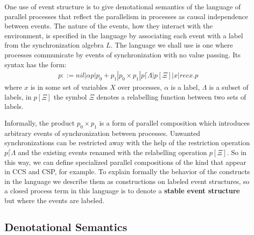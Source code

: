 
One use of event structure is to give denotational semantics of the language of parallel
processes that reflect the parallelism in processes as causal independence between events.
The nature of the events, how they interact with the environment,
is specified in the language by associating each event with a label from the synchronization
algebra $L$.
The language we shall use is one where processes communicate by events of synchronization
with no value passing.
Its syntax has the form:
\begin{align*}
    p ::= nil | \alpha p | p_0 + p_1 | p_0 \times p_1 | p\lceil \Lambda | p[\Xi] | x | recx.p
\end{align*}
where $x$ is in some set of variables $X$ over processes, $\alpha$ is a label,
$\Lambda$ is a subset of labels, in $p[\Xi]$ the symbol $\Xi$ denotes a relabelling function between
two sets of labels.

Informally, the product $p_0 \times p_1$ is a form of parallel composition which introduces
arbitrary events of synchronization between processes.
Unwanted synchronizations can be restricted away with the help of the restriction operation
$p\lceil \Lambda$ and the existing events renamed with the relabelling operation $p[\Xi]$.
So in this way, we can define specialized parallel compositions of the kind that appear in
CCS and CSP, for example.
To explain formally the behavior of the constructs in the language we describe them as
constructions on labeled event structures, so a closed process term in this language is to
denote a \textbf{stable event structure} but where the events are labeled.

\subsection{Denotational Semantics}

